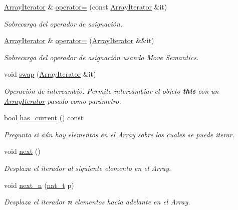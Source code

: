 \begin{DoxyCompactItemize}
\hyperlink{class_designar_1_1_array_iterator}{Array\+Iterator} \& \hyperlink{class_designar_1_1_array_iterator_a26d812ac595156aed963e60d41d91fa7}{operator=} (const \hyperlink{class_designar_1_1_array_iterator}{Array\+Iterator} \&it)
\begin{DoxyCompactList}\small\item\em Sobrecarga del operador de asignación. \end{DoxyCompactList}\item 
\hyperlink{class_designar_1_1_array_iterator}{Array\+Iterator} \& \hyperlink{class_designar_1_1_array_iterator_a219eb8e4d831f490cf9cdcb1f60dcacc}{operator=} (\hyperlink{class_designar_1_1_array_iterator}{Array\+Iterator} \&\&it)
\begin{DoxyCompactList}\small\item\em Sobrecarga del operador de asignación usando Move Semantics. \end{DoxyCompactList}\item 
void \hyperlink{class_designar_1_1_array_iterator_a6c3a5bf56a2b7da838ca773368e4699a}{swap} (\hyperlink{class_designar_1_1_array_iterator}{Array\+Iterator} \&it)
\begin{DoxyCompactList}\small\item\em Operación de intercambio. Permite intercambiar el objeto {\bfseries this} con un \hyperlink{class_designar_1_1_array_iterator}{Array\+Iterator} pasado como parámetro. \end{DoxyCompactList}\item 
bool \hyperlink{class_designar_1_1_array_iterator_aafec192c97299c4f21c28c65e58b19fc}{has\+\_\+current} () const
\begin{DoxyCompactList}\small\item\em Pregunta si aún hay elementos en el Array sobre los cuales se puede iterar. \end{DoxyCompactList}\item 
void \hyperlink{class_designar_1_1_array_iterator_ac4e929d3247b68c3c9cffb43ec0891ec}{next} ()
\begin{DoxyCompactList}\small\item\em Desplaza el iterador al {\itshape siguiente} elemento en el Array. \end{DoxyCompactList}\item 
void \hyperlink{class_designar_1_1_array_iterator_a8709128b09b8b177fa1b042cb330c3e5}{next\+\_\+n} (\hyperlink{namespace_designar_aa72662848b9f4815e7bf31a7cf3e33d1}{nat\+\_\+t} p)
\begin{DoxyCompactList}\small\item\em Desplaza el iterador {\bfseries n} elementos hacia adelante en el Array. \end{DoxyCompactList}\item 

\end{DoxyCompactItemize}
